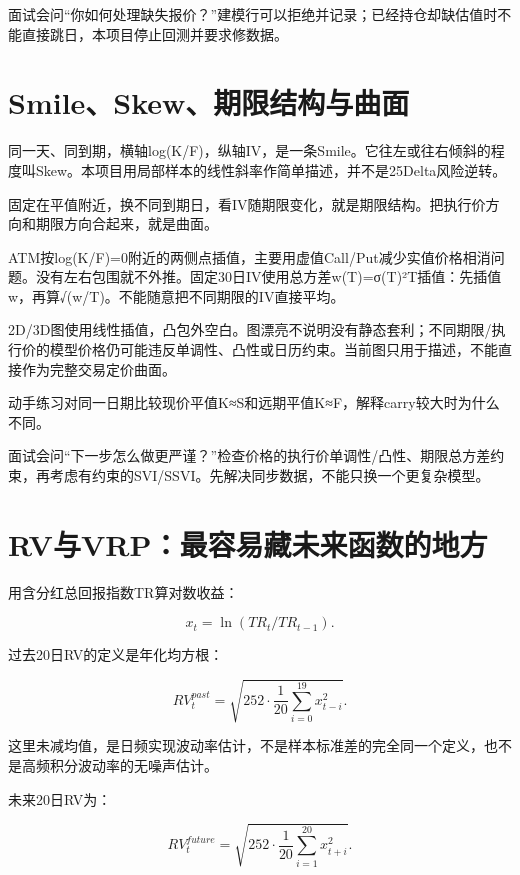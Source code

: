 \documentclass[UTF8,11pt,a4paper]{ctexart}
\begin{document}
\begin{learningbox}{面试会问}“你如何处理缺失报价？”建模行可以拒绝并记录；已经持仓却缺估值时不能直接跳日，本项目停止回测并要求修数据。\end{learningbox}


\section{Smile、Skew、期限结构与曲面}

同一天、同到期，横轴log(K/F)，纵轴IV，是一条Smile。它往左或往右倾斜的程度叫Skew。本项目用局部样本的线性斜率作简单描述，并不是25Delta风险逆转。

固定在平值附近，换不同到期日，看IV随期限变化，就是期限结构。把执行价方向和期限方向合起来，就是曲面。

ATM按log(K/F)=0附近的两侧点插值，主要用虚值Call/Put减少实值价格相消问题。没有左右包围就不外推。固定30日IV使用总方差w(T)=σ(T)²T插值：先插值w，再算√(w/T)。不能随意把不同期限的IV直接平均。

2D/3D图使用线性插值，凸包外空白。图漂亮不说明没有静态套利；不同期限/执行价的模型价格仍可能违反单调性、凸性或日历约束。当前图只用于描述，不能直接作为完整交易定价曲面。

\begin{learningbox}{动手练习}对同一日期比较现价平值K≈S和远期平值K≈F，解释carry较大时为什么不同。\end{learningbox}

\begin{learningbox}{面试会问}“下一步怎么做更严谨？”检查价格的执行价单调性/凸性、期限总方差约束，再考虑有约束的SVI/SSVI。先解决同步数据，不能只换一个更复杂模型。\end{learningbox}


\section{RV与VRP：最容易藏未来函数的地方}

用含分红总回报指数TR算对数收益：

\[
x_t=\ln(TR_t/TR_{t-1}).
\]

过去20日RV的定义是年化均方根：

\[
RV^{past}_t=\sqrt{252\cdot\frac1{20}\sum_{i=0}^{19}x_{t-i}^2}.
\]

这里未减均值，是日频实现波动率估计，不是样本标准差的完全同一个定义，也不是高频积分波动率的无噪声估计。

未来20日RV为：

\[
RV^{future}_t=\sqrt{252\cdot\frac1{20}\sum_{i=1}^{20}x_{t+i}^2}.
\]
\end{document}
